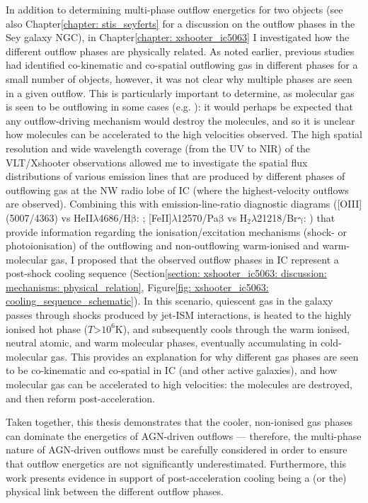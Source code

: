 In addition to determining multi-phase outflow energetics for two objects (see also Chapter\;\ref{chapter: stis_seyferts} for a discussion on the outflow phases in the Sey galaxy NGC), in Chapter\;\ref{chapter: xshooter_ic5063} I investigated how the different outflow phases are physically related. As noted earlier, previous studies had identified co-kinematic and co-spatial outflowing gas in different phases for a small number of objects, however, it was not clear why multiple phases are seen in a given outflow. This is particularly important to determine, as molecular gas is seen to be outflowing in some cases (e.g. \citealt{Tadhunter2014}): it would perhaps be expected that any outflow-driving mechanism would destroy the molecules, and so it is unclear how molecules can be accelerated to the high velocities observed. The high spatial resolution and wide wavelength coverage (from the UV to NIR) of the VLT/Xshooter observations allowed me to investigate the spatial flux distributions of various emission lines that are produced by different phases of outflowing gas at the NW radio lobe of IC (where the highest-velocity outflows are observed). Combining this with emission-line-ratio diagnostic diagrams ([OIII](5007/4363) vs HeII$\lambda$4686/H$\mathrm{\beta}$: \citealt{VillarMartin1999}; [FeII]$\lambda$12570/Pa$\mathrm{\beta}$ vs H$_2\lambda$21218/Br$\mathrm{\gamma}$: \citealt{Larkin1998, Rodriguez-Ardila2005, Riffel2013a, Colina2015, Riffel2021}) that provide information regarding the ionisation/excitation mechanisms (shock- or photoionisation) of the outflowing and non-outflowing warm-ionised and warm-molecular gas, I proposed that the observed outflow phases in IC represent a post-shock cooling sequence (Section\;\ref{section: xshooter_ic5063: discussion: mechanisms: physical_relation}, Figure\;\ref{fig: xshooter_ic5063: cooling_sequence_schematic}). In this scenario, quiescent gas in the galaxy passes through shocks produced by jet-ISM interactions, is heated to the highly ionised hot phase ($T$\;\textgreater\;$10^6$\;K), and subsequently cools through the warm ionised, neutral atomic, and warm molecular phases, eventually accumulating in cold-molecular gas. This provides an explanation for why different gas phases are seen to be co-kinematic and co-spatial in IC (and other active galaxies), and how molecular gas can be accelerated to high velocities: the molecules are destroyed, and then reform post-acceleration.

Taken together, this thesis demonstrates that the cooler, non-ionised gas phases can dominate the energetics of AGN-driven outflows --- therefore, the multi-phase nature of AGN-driven outflows must be carefully considered in order to ensure that outflow energetics are not significantly underestimated. Furthermore, this work presents evidence in support of post-acceleration cooling being a (or the) physical link between the different outflow phases.

